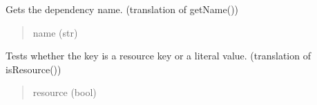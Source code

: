 \documentclass[letterpaper,10pt,english]{sphinxmanual}
\begin{document}
\begin{fulllineitems}
\begin{fulllineitems}
\begin{quote}
\begin{description}
\end{description}\end{quote}

\end{fulllineitems}


\begin{fulllineitems}
\label{\detokenize{apache_commons_validator_python:apache_commons_validator_python.msg_new.Msg.name}}
\pysigstartsignatures
{}
\pysigstopsignatures
\sphinxAtStartPar
Gets the dependency name.
(translation of getName())
\begin{quote}\begin{description}
\sphinxAtStartPar
name (str)

\end{description}\end{quote}

\end{fulllineitems}


\begin{fulllineitems}
\label{\detokenize{apache_commons_validator_python:apache_commons_validator_python.msg_new.Msg.resource}}
\pysigstartsignatures
{}
\pysigstopsignatures
\sphinxAtStartPar
Tests whether the key is a resource key or a literal value.
(translation of isResource())
\begin{quote}\begin{description}
\sphinxAtStartPar
resource (bool)

\end{description}\end{quote}

\end{fulllineitems}



\end{fulllineitems}
\end{document}
